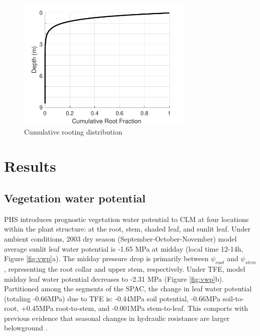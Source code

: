 \documentclass[draft,linenumbers]{agujournal}
\begin{document}
  \begin{figure}[h]
     \centering
     \includegraphics[width=20pc]{../figs3/roots.pdf}
     \caption{Cumulative rooting distribution}
     \label{roots}
  \end{figure}

\section{Results}  
\subsection{Vegetation water potential}

    PHS introduces prognostic vegetation water potential to CLM at four locations within the plant structure: at the root, stem, shaded leaf, and sunlit leaf.
    Under ambient conditions, 2003 dry season (September-October-November) model average sunlit leaf water potential is -1.65 MPa at midday (local time 12-14h, Figure \ref{fig:vwp}a). 
    The midday pressure drop is primarily between $\psi_{root}$ and $\psi_{stem}$, representing the root collar and upper stem, respectively.
    Under TFE, model midday leaf water potential decreases to -2.31 MPa (Figure \ref{fig:vwp}b). 
    Partitioned among the segments of the SPAC, the change in leaf water potential (totaling -0.66MPa) due to TFE is:
    -0.44MPa soil potential,
    -0.66MPa soil-to-root,
    +0.45MPa root-to-stem, and 
    -0.001MPa stem-to-leaf.
    This comports with previous evidence that seasonal changes in hydraulic resistance are larger belowground \citep{fisher2006}.
    
\end{document}
